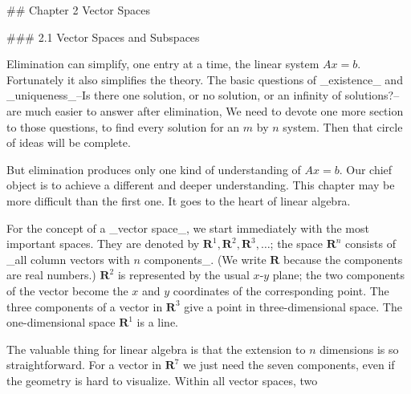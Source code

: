 

## Chapter 2 Vector Spaces

### 2.1 Vector Spaces and Subspaces

Elimination can simplify, one entry at a time, the linear system \(Ax=b\). Fortunately it also simplifies the theory. The basic questions of _existence_ and _uniqueness_--Is there one solution, or no solution, or an infinity of solutions?--are much easier to answer after elimination, We need to devote one more section to those questions, to find every solution for an \(m\) by \(n\) system. Then that circle of ideas will be complete.

But elimination produces only one kind of understanding of \(Ax=b\). Our chief object is to achieve a different and deeper understanding. This chapter may be more difficult than the first one. It goes to the heart of linear algebra.

For the concept of a _vector space_, we start immediately with the most important spaces. They are denoted by \(\mathbf{R}^{1},\mathbf{R}^{2},\mathbf{R}^{3},\ldots\); the space \(\mathbf{R}^{n}\) consists of _all column vectors with \(n\) components_. (We write \(\mathbf{R}\) because the components are real numbers.) \(\mathbf{R}^{2}\) is represented by the usual \(x\)-\(y\) plane; the two components of the vector become the \(x\) and \(y\) coordinates of the corresponding point. The three components of a vector in \(\mathbf{R}^{3}\) give a point in three-dimensional space. The one-dimensional space \(\mathbf{R}^{1}\) is a line.

The valuable thing for linear algebra is that the extension to \(n\) dimensions is so straightforward. For a vector in \(\mathbf{R}^{7}\) we just need the seven components, even if the geometry is hard to visualize. Within all vector spaces, two